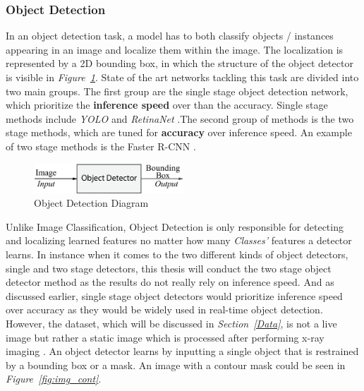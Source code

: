 \documentclass[12pt]{extarticle}
\begin{document}
	\subsubsection{Object Detection}\label{Obj Detection}
	In an object detection task, a model has to both classify objects / instances appearing in an image and localize them within the image. The localization is represented by a 2D bounding box, in which the structure of the object detector is visible in \emph{Figure~\ref{fig:Obj Detector}}. State of the art networks tackling this task are divided into two main groups. The first group are the single stage object detection network, which prioritize the \textbf{inference speed} over than the accuracy. Single stage methods include \emph{YOLO} \cite{Objdet2} and \emph{RetinaNet} \cite{Retina}.The second group of methods is the two stage methods, which are tuned for \textbf{accuracy} over inference speed. An example of two stage methods is the Faster R-CNN \cite{Objdet}.
	\begin{figure}[h]
		\centering
		\includegraphics[width=0.5\textwidth]{pics/Figures/Obj_Det_Block_Diagram.eps}
		\caption{\small{Object Detection Diagram}}
		\label{fig:Obj Detector}
	\end{figure}
	Unlike Image Classification, Object Detection is only responsible for detecting and localizing learned features no matter how many \emph{Classes'} features a detector learns. In instance when it comes to the two different kinds of object detectors, single and two stage detectors, this thesis will conduct the two stage object detector method as the results do not really rely on inference speed. And as discussed earlier, single stage object detectors would prioritize inference speed over accuracy as they would be widely used in real-time object detection. However, the dataset, which will be discussed in \emph{Section~\ref{Data}}, is not a live image but rather a static image which is processed after performing x-ray imaging \cite{mammography}. An object detector learns by inputting a single object that is restrained by a bounding box or a mask. An image with a contour mask could be seen in \emph{Figure~\ref{fig:img_cont}}.
\end{document}
